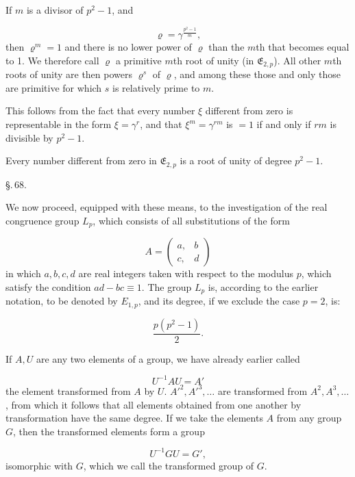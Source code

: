 
If $m$ is a divisor of $p^2-1$, and

\[
\varrho = \gamma^{\frac{p^2-1}{m}},
\]
then $\varrho^m=1$ and there is no lower power of $\varrho$ than the $m$th
that becomes equal to 1. We therefore call $\varrho$ a
primitive $m$th root of unity (in $\mathfrak{E}_{2,p}$). All other $m$th
roots of unity are then powers $\varrho^s$ of $\varrho$, and among these
those and only those are primitive for which $s$ is relatively prime to $m$.

This follows from the fact that every number $\xi$ different from zero
is representable in the form $\xi=\gamma^r$, and that $\xi^m=\gamma^{rm}$ is
$=1$ if and only if $rm$ is divisible by $p^2-1$.

Every number different from zero in $\mathfrak{E}_{2,p}$ is a root of unity
 of degree $p^2-1$.

\begin{center}
\S.\,68.

\end{center}

We now proceed, equipped with these means, to the
investigation of the real congruence group $L_p$, which consists of all
substitutions of the form

\[
A = \begin{pmatrix} a, & b \\ c, & d \end{pmatrix}
\]
in which $a, b, c, d$ are real integers taken with respect to the modulus $p$,
which satisfy the condition $ad-bc\equiv 1$.
The group $L_p$ is, according to the earlier notation, to be denoted
by $E_{1,p}$, and its degree, if we exclude the case $p=2$, is:

\[
\frac{p(p^2-1)}{2}.
\]

If $A, U$ are any two elements of a group, we have
already earlier called

\[
U^{-1}AU = A'
\]
the element transformed from $A$ by $U$. $A'^2, A'^3, \ldots$
are transformed from $A^2, A^3, \ldots$, from which it follows that all
elements obtained from one another by transformation have the same
degree. If we take the elements $A$ from any
group $G$, then the transformed elements form a group

\[
U^{-1}GU = G',
\]
isomorphic with $G$, which we call the transformed group of $G$.
